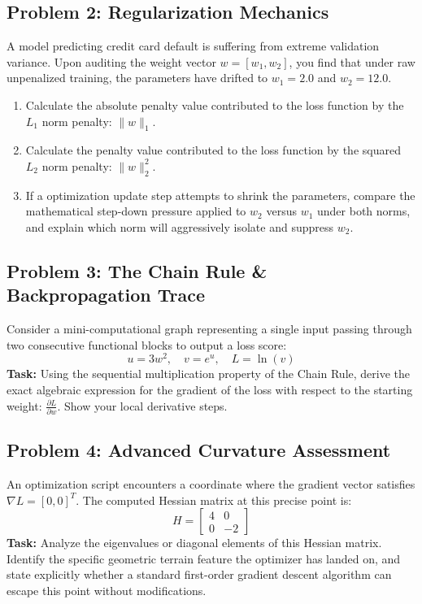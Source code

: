 \documentclass[12pt,a4paper]{article}
\begin{document}
\subsection*{Problem 2: Regularization Mechanics}
A model predicting credit card default is suffering from extreme validation variance. Upon auditing the weight vector $w = [w_1, w_2]$, you find that under raw unpenalized training, the parameters have drifted to $w_1 = 2.0$ and $w_2 = 12.0$.
\begin{enumerate}
    \item Calculate the absolute penalty value contributed to the loss function by the $L_1$ norm penalty: $\|w\|_1$.
    \item Calculate the penalty value contributed to the loss function by the squared $L_2$ norm penalty: $\|w\|_2^2$.
    \item If a optimization update step attempts to shrink the parameters, compare the mathematical step-down pressure applied to $w_2$ versus $w_1$ under both norms, and explain which norm will aggressively isolate and suppress $w_2$.
\end{enumerate}

\subsection*{Problem 3: The Chain Rule \& Backpropagation Trace}
Consider a mini-computational graph representing a single input passing through two consecutive functional blocks to output a loss score:
$$u = 3w^2, \quad v = e^u, \quad L = \ln(v)$$
\textbf{Task:} Using the sequential multiplication property of the Chain Rule, derive the exact algebraic expression for the gradient of the loss with respect to the starting weight: $\frac{\partial L}{\partial w}$. Show your local derivative steps.

\subsection*{Problem 4: Advanced Curvature Assessment}
An optimization script encounters a coordinate where the gradient vector satisfies $\nabla L = [0, 0]^T$. The computed Hessian matrix at this precise point is:
$$H = \begin{bmatrix} 4 & 0 \\ 0 & -2 \end{bmatrix}$$
\textbf{Task:} Analyze the eigenvalues or diagonal elements of this Hessian matrix. Identify the specific geometric terrain feature the optimizer has landed on, and state explicitly whether a standard first-order gradient descent algorithm can escape this point without modifications.
\end{document}

